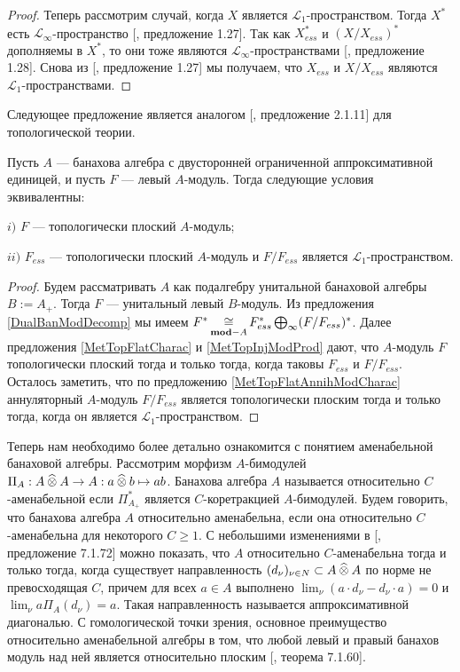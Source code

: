 \begin{proof}
Теперь рассмотрим случай, когда $X$ является $\mathscr{L}_1$-пространством. Тогда $X^*$ есть $\mathscr{L}_\infty$-пространство [\cite{BourgNewClOfLpSp}, предложение 1.27]. Так как $X_{ess}^*$ и $(X/X_{ess})^*$ дополняемы в $X^*$, то они тоже являются $\mathscr{L}_\infty$-пространствами [\cite{BourgNewClOfLpSp}, предложение 1.28]. Снова из [\cite{BourgNewClOfLpSp}, предложение 1.27] мы получаем, что $X_{ess}$ и $X/X_{ess}$ являются $\mathscr{L}_1$-пространствами.
\end{proof}

Следующее предложение является аналогом [\cite{RamsHomPropSemgroupAlg}, предложение 2.1.11] для топологической теории.

\begin{proposition}\label{TopFlatModCharac} Пусть $A$ --- банахова алгебра с двусторонней ограниченной аппроксимативной единицей, и пусть $F$ --- левый $A$-модуль. Тогда следующие условия эквивалентны:

$i)$ $F$ --- топологически плоский $A$-модуль;

$ii)$  $F_{ess}$ --- топологически плоский $A$-модуль и $F/F_{ess}$ является $\mathscr{L}_1$-пространством.
\end{proposition}
\begin{proof} Будем рассматривать $A$ как подалгебру унитальной банаховой алгебры $B:=A_+$. Тогда $F$ --- унитальный левый $B$-модуль. Из предложения \ref{DualBanModDecomp} мы имеем $F^*\mathop{\mathbin{\cong}}\limits_{\mathbf{mod}-A}F_{ess}^*\bigoplus_\infty (F/F_{ess})^*$. Далее предложения \ref{MetTopFlatCharac} и \ref{MetTopInjModProd} дают, что $A$-модуль $F$ топологически плоский тогда и только тогда, когда таковы $F_{ess}$ и $F/F_{ess}$. Осталось заметить, что по предложению \ref{MetTopFlatAnnihModCharac} аннуляторный $A$-модуль $F/F_{ess}$ является топологически плоским тогда и только тогда, когда он является $\mathscr{L}_1$-пространством.
\end{proof}

Теперь нам необходимо более детально ознакомится с понятием аменабельной банаховой алгебры.
Рассмотрим морфизм $A$-бимодулей $\Pi_A:A\mathbin{\widehat{\otimes}} A\to A:a\mathbin{\widehat{\otimes}} b\mapsto ab$. Банахова алгебра $A$ называется относительно $C$-аменабельной если $\Pi_{A_+}^*$ является $C$-коретракцией $A$-бимодулей. Будем говорить, что банахова алгебра $A$ относительно аменабельна, если она относительно $C$-аменабельна для некоторого $C\geq 1$.  С небольшими изменениями в [\cite{HelBanLocConvAlg}, предложение 7.1.72] можно показать, что $A$ относительно $C$-аменабельна тогда и только тогда, когда существует направленность $(d_\nu)_{\nu\in N}\subset A\mathbin{\widehat{\otimes}} A$ по норме не превосходящая $C$, причем для всех $a\in A$ выполнено $\lim_\nu(a\cdot d_\nu-d_\nu\cdot a)=0$ и $\lim_\nu a\Pi_A(d_\nu)=a$. Такая направленность называется аппроксимативной диагональю. С гомологической точки зрения, основное преимущество относительно аменабельной алгебры в том, что любой левый и правый банахов модуль над ней является относительно плоским [\cite{HelBanLocConvAlg}, теорема 7.1.60].

